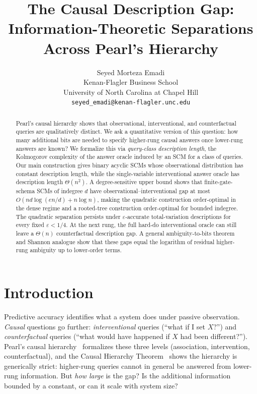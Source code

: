 \documentclass{article}
\title{The Causal Description Gap:\\
Information-Theoretic Separations Across Pearl's Hierarchy}
\author{%
  Seyed Morteza Emadi \\
  Kenan-Flagler Business School \\
  University of North Carolina at Chapel Hill \\
  \texttt{seyed\_emadi@kenan-flagler.unc.edu}%
}
\theoremstyle{plain}
\theoremstyle{definition}
\begin{document}
\maketitle

\begin{abstract}
Pearl's causal hierarchy shows that observational, interventional, and counterfactual queries are qualitatively distinct. We ask a quantitative version of this question: how many additional bits are needed to specify higher-rung causal answers once lower-rung answers are known? We formalize this via \emph{query-class description length}, the Kolmogorov complexity of the answer oracle induced by an SCM for a class of queries. Our main construction gives binary acyclic SCMs whose observational distribution has constant description length, while the single-variable interventional answer oracle has description length $\Theta(n^2)$. A degree-sensitive upper bound shows that finite-gate-schema SCMs of indegree $d$ have observational--interventional gap at most $O(nd\log(en/d)+n\log n)$, making the quadratic construction order-optimal in the dense regime and a rooted-tree construction order-optimal for bounded indegree. The quadratic separation persists under $\varepsilon$-accurate total-variation descriptions for every fixed $\varepsilon<1/4$. At the next rung, the full hard-do interventional oracle can still leave a $\Theta(n)$ counterfactual description gap. A general ambiguity-to-bits theorem and Shannon analogue show that these gaps equal the logarithm of residual higher-rung ambiguity up to lower-order terms.
\end{abstract}


\section{Introduction}
\label{sec:intro}

Predictive accuracy identifies what a system does under passive observation. \emph{Causal} questions go further: \emph{interventional} queries (``what if I set $X$?'') and \emph{counterfactual} queries (``what would have happened if $X$ had been different?''). Pearl's causal hierarchy~\citep{pearl2009causality} formalizes these three levels (association, intervention, counterfactual), and the Causal Hierarchy Theorem~\citep{bareinboim2022pearl} shows the hierarchy is generically strict: higher-rung queries cannot in general be answered from lower-rung information. But \emph{how large} is the gap? Is the additional information bounded by a constant, or can it scale with system size?
\end{document}
